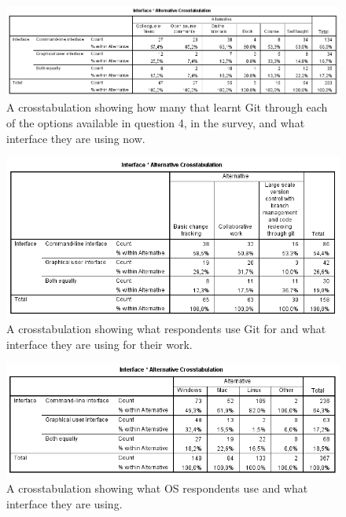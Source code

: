\documentclass[a4paper,oneside]{bth} %
\begin{document}
		\begin{figure}[H]
			\centering
			\includegraphics[width=1\textwidth]{graphs/crosstabulation-learnt-using.png}
			\caption{A crosstabulation showing how many that learnt Git through each of the options available in question 4, in the survey, and what interface they are using now.}
			\label{fig:crosstabulation - what interface they are using x how they learnt Git}
		\end{figure}
		
		\begin{figure}[H]
			\centering
			\includegraphics[width=1\textwidth]{graphs/crosstabulation-how-using-git-interface.png}
			\caption{A crosstabulation showing what respondents use Git for and what interface they are using for their work.}
			\label{fig:crosstabulation - what interface they are using x what they use Git for.}
		\end{figure}
		
		\begin{figure}[H]
			\centering
			\includegraphics[width=1\textwidth]{graphs/crosstabulation-os-using.png}
			\caption{A crosstabulation showing what OS respondents use and what interface they are using.}
			\label{fig:crosstabulation - what interface they are using x what OS they use.}
		\end{figure}
		
\end{document}
